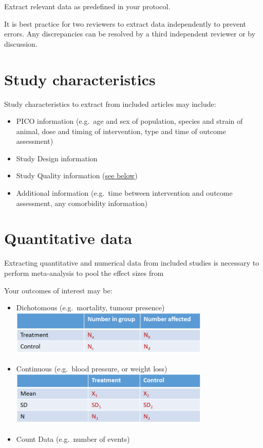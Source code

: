 \documentclass[
]{book}
\begin{document}
Extract relevant data as predefined in your protocol.

It is best practice for two reviewers to extract data independently to prevent errors. Any discrepancies can be resolved by a third independent reviewer or by discussion.

\hypertarget{study-characteristics}{%
\section{Study characteristics}\label{study-characteristics}}

Study characteristics to extract from included articles may include:

\begin{itemize}
\item
  PICO information (e.g.~age and sex of population, species and strain of animal, dose and timing of intervention, type and time of outcome assessment)
\item
  Study Design information
\item
  Study Quality information (\protect\hyperlink{Quality-Assessment}{see below})
\item
  Additional information (e.g.~time between intervention and outcome assessment, any comorbidity information)
\end{itemize}

\hypertarget{quantitative-data}{%
\section{Quantitative data}\label{quantitative-data}}

Extracting quantitative and numerical data from included studies is necessary to perform meta-analysis to pool the effect sizes from

Your outcomes of interest may be:

\begin{itemize}
\item
  Dichotomous (e.g.~mortality, tumour presence) \includegraphics[width=0.75\textwidth,height=0.75\textheight]{figs/dichot-outcome.png}
\item
  Continuous (e.g.~blood pressure, or weight loss) \includegraphics[width=0.75\textwidth,height=0.75\textheight]{figs/contin-outcome.png}
\item
  Count Data (e.g.~number of events)
\end{itemize}
\end{document}
